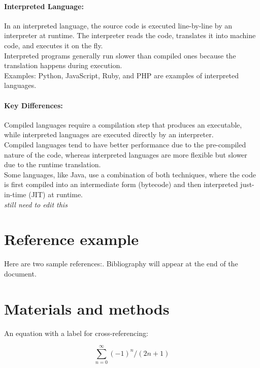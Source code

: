 \documentclass[12pt,halfline,a4paper,]{ouparticle}
\begin{document}
\paragraph{Interpreted Language:}\label{interpreted-language}

\hfill\break
In an interpreted language, the source code is executed line-by-line by
an interpreter at runtime. The interpreter reads the code, translates it
into machine code, and executes it on the fly.\\
Interpreted programs generally run slower than compiled ones because the
translation happens during execution.\\
Examples: Python, JavaScript, Ruby, and PHP are examples of interpreted
languages.

\paragraph{Key Differences:}\label{key-differences}

Compiled languages require a compilation step that produces an
executable, while interpreted languages are executed directly by an
interpreter.\\
Compiled languages tend to have better performance due to the
pre-compiled nature of the code, whereas interpreted languages are more
flexible but slower due to the runtime translation.\\
Some languages, like Java, use a combination of both techniques, where
the code is first compiled into an intermediate form (bytecode) and then
interpreted just-in-time (JIT) at runtime.\\
\emph{still need to edit this}

\newpage

\section{Reference example}\label{reference-example}

Here are two sample references:. Bibliography will appear at the end of
the document.

\section{Materials and methods}\label{materials-and-methods}

An equation with a label for cross-referencing:

\begin{equation}\label{eq:eq1}
\sum_{n=0}^{\infty} (-1)^n/(2n+1)
\end{equation}
\end{document}
